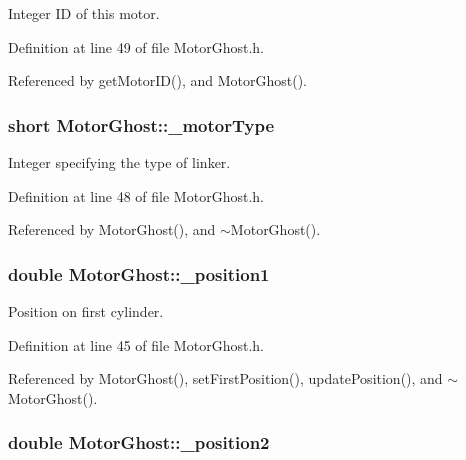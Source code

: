 Integer I\+D of this motor. 



Definition at line 49 of file Motor\+Ghost.\+h.



Referenced by get\+Motor\+I\+D(), and Motor\+Ghost().

\hypertarget{classMotorGhost_aadd08ee5f5ab0bf5402da7ebc65d8375}{
\subsubsection[{\+\_\+motor\+Type}]{\setlength{\rightskip}{0pt plus 5cm}short Motor\+Ghost\+::\+\_\+motor\+Type\hspace{0.3cm}{\ttfamily [private]}}}\label{classMotorGhost_aadd08ee5f5ab0bf5402da7ebc65d8375}


Integer specifying the type of linker. 



Definition at line 48 of file Motor\+Ghost.\+h.



Referenced by Motor\+Ghost(), and $\sim$\+Motor\+Ghost().

\hypertarget{classMotorGhost_a94bcda46aa9e2bc0b53ec33fc7e38c3f}{
\subsubsection[{\+\_\+position1}]{\setlength{\rightskip}{0pt plus 5cm}double Motor\+Ghost\+::\+\_\+position1\hspace{0.3cm}{\ttfamily [private]}}}\label{classMotorGhost_a94bcda46aa9e2bc0b53ec33fc7e38c3f}


Position on first cylinder. 



Definition at line 45 of file Motor\+Ghost.\+h.



Referenced by Motor\+Ghost(), set\+First\+Position(), update\+Position(), and $\sim$\+Motor\+Ghost().

\hypertarget{classMotorGhost_a1f5b96676836599c4b43b98a4aebe556}{
\subsubsection[{\+\_\+position2}]{\setlength{\rightskip}{0pt plus 5cm}double Motor\+Ghost\+::\+\_\+position2\hspace{0.3cm}{\ttfamily [private]}}}\label{classMotorGhost_a1f5b96676836599c4b43b98a4aebe556}


